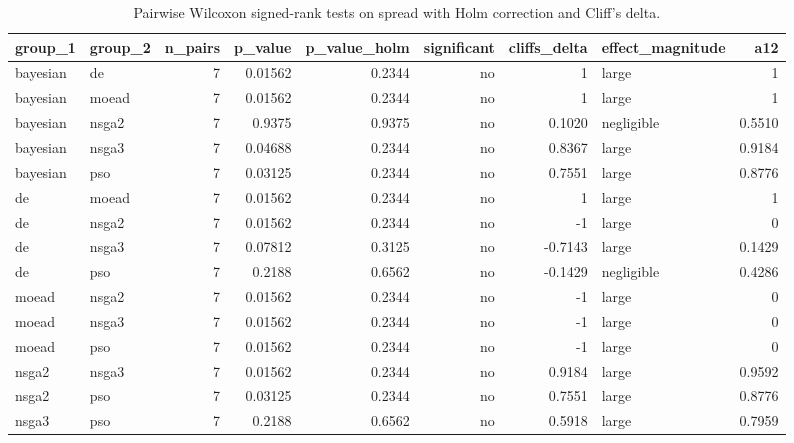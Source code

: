 \begin{table}[!t]
\centering
\caption{Pairwise Wilcoxon signed-rank tests on spread with Holm correction and Cliff's delta.}
\label{tab:statistics_optimizer_pairwise_spread_main}
\footnotesize
\begin{tabular}{llrrrrrlr}
\toprule
group\_1 & group\_2 & n\_pairs & p\_value & p\_value\_holm & significant & cliffs\_delta & effect\_magnitude & a12 \\
\midrule
bayesian & de & 7 & 0.01562 & 0.2344 & no & 1 & large & 1 \\
bayesian & moead & 7 & 0.01562 & 0.2344 & no & 1 & large & 1 \\
bayesian & nsga2 & 7 & 0.9375 & 0.9375 & no & 0.1020 & negligible & 0.5510 \\
bayesian & nsga3 & 7 & 0.04688 & 0.2344 & no & 0.8367 & large & 0.9184 \\
bayesian & pso & 7 & 0.03125 & 0.2344 & no & 0.7551 & large & 0.8776 \\
de & moead & 7 & 0.01562 & 0.2344 & no & 1 & large & 1 \\
de & nsga2 & 7 & 0.01562 & 0.2344 & no & -1 & large & 0 \\
de & nsga3 & 7 & 0.07812 & 0.3125 & no & -0.7143 & large & 0.1429 \\
de & pso & 7 & 0.2188 & 0.6562 & no & -0.1429 & negligible & 0.4286 \\
moead & nsga2 & 7 & 0.01562 & 0.2344 & no & -1 & large & 0 \\
moead & nsga3 & 7 & 0.01562 & 0.2344 & no & -1 & large & 0 \\
moead & pso & 7 & 0.01562 & 0.2344 & no & -1 & large & 0 \\
nsga2 & nsga3 & 7 & 0.01562 & 0.2344 & no & 0.9184 & large & 0.9592 \\
nsga2 & pso & 7 & 0.03125 & 0.2344 & no & 0.7551 & large & 0.8776 \\
nsga3 & pso & 7 & 0.2188 & 0.6562 & no & 0.5918 & large & 0.7959 \\
\bottomrule
\end{tabular}
\end{table}
